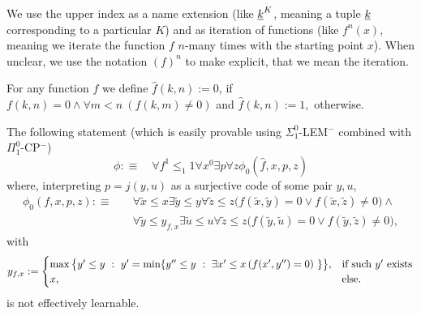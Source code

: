 We use the upper index as a name extension (like $\underline k^K$, meaning a tuple $\underline k$ corresponding to a particular $K$) and as iteration of functions (like $f^n(x)$, meaning we iterate the function $f$ $n$-many times with the starting point $x$). When unclear, we use the notation $(f)^n$ to make explicit, that we mean the iteration.


\begin{dfn}
For any function $f$ we define $\widehat{f}(k,n):=0$, 
if $f(k,n)=0\wedge\forall m<n\ (f(k,m)\neq 0)$ and $\widehat{f}(k,n):=1,$ 
otherwise.
\end{dfn}

\begin{prop}\label{p:nonLearnablePhi} The following statement 
(which is easily provable using {\rm $\Sigma^0_1$-LEM$^-$} combined with 
{\rm $\Pi^0_1$-CP$^-$}) 
\[
\phi:\equiv\quad\forall f^1\leq_1 1 \forall x^0 \exists p  \forall z \phi_0 
(\widehat{f},x,p,z)
\]
where, interpreting $p=j(y,u)$ 
as a surjective code of some pair $y,u$,
\begin{align*}
\phi_0(f,x,p,z):\equiv\quad &\forall \tilde x \leq x \exists \tilde y\leq y \forall \tilde z\leq z 
\big(f(\tilde x,\tilde y)=0\vee f(\tilde x,\tilde z)\neq0\big) 
\wedge \\
&\forall \tilde y \leq y_{f,x} \exists \tilde u\leq u \forall \tilde z\leq z 
\big(f(\tilde y,\tilde u)=0\vee f(\tilde y,\tilde z)\neq0\big),
\end{align*}
with
\[
y_{f,x}:=\begin{cases}
\max\big\{y'\leq y\ :\ y'=\min\{y''\leq y\ :\ \exists x'\le x\,(f(x',y'')=0)
\ \}\big\},&\text{if such $y'$ exists}\\
x,&\text{else}.
\end{cases}
\]
is not effectively learnable.\end{prop}
